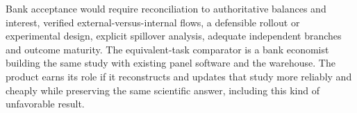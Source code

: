 Bank acceptance would require reconciliation to authoritative balances
and interest, verified external-versus-internal flows, a defensible rollout
or experimental design, explicit spillover analysis, adequate independent
branches and outcome maturity. The equivalent-task comparator is a bank
economist building the same study with existing panel software and the
warehouse. The product earns its role if it reconstructs and updates that
study more reliably and cheaply while preserving the same scientific
answer, including this kind of unfavorable result.
